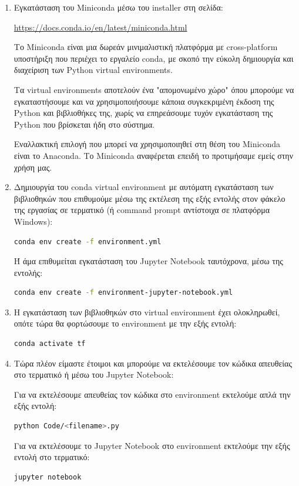 \documentclass[12pt,a4paper]{article}
\begin{document}
\begin{enumerate}
    \item Εγκατάσταση του Miniconda μέσω του installer στη σελίδα:

        \textcolor{blue}{\href{https://docs.conda.io/en/latest/miniconda.html}{https://docs.conda.io/en/latest/miniconda.html}}

         Το Miniconda είναι μια δωρεάν μινιμαλιστική πλατφόρμα με cross-platform υποστήριξη που περιέχει το εργαλείο conda, με σκοπό την εύκολη δημιουργία και διαχείριση των Python virtual environments.

         Τα virtual environments αποτελούν ένα "απομονωμένο χώρο" όπου μπορούμε να εγκαταστήσουμε και να χρησιμοποιήσουμε κάποια συγκεκριμένη έκδοση της Python και βιβλιοθήκες της, χωρίς να επηρεάσουμε τυχόν εγκατάσταση της Python που βρίσκεται ήδη στο σύστημα. 

         Εναλλακτική επιλογή που μπορεί να χρησιμοποιηθεί στη θέση του Miniconda είναι το Anaconda. Το Miniconda αναφέρεται επειδή το προτιμήσαμε εμείς στην χρήση μας.

     \item Δημιουργία του conda virtual environment με αυτόματη εγκατάσταση των βιβλιοθηκών που επιθυμούμε μέσω της εκτέλεση της εξής εντολής στον φάκελο της εργασίας σε τερματικό (ή command prompt αντίστοιχα σε πλατφόρμα Windows):

         \begin{lstlisting}[language=Bash]
conda env create -f environment.yml\end{lstlisting}

         Ή άμα επιθυμείται εγκατάσταση του Jupyter Notebook ταυτόχρονα, μέσω της εντολής:

         \begin{lstlisting}[language=Bash]
conda env create -f environment-jupyter-notebook.yml\end{lstlisting}
     \item Η εγκατάσταση των βιβλιοθηκών στο virtual environment έχει ολοκληρωθεί, οπότε τώρα θα φορτώσουμε το environment με την εξής εντολή:
         \begin{lstlisting}[language=Bash]
conda activate tf\end{lstlisting}
    \item Τώρα πλέον είμαστε έτοιμοι και μπορούμε να εκτελέσουμε τον κώδικα απευθείας στο τερματικό ή μέσω του Jupyter Notebook:

        Για να εκτελέσουμε απευθείας τον κώδικα στο environment εκτελούμε απλά την εξής εντολή:
         \begin{lstlisting}[language=Bash]
python Code/<filename>.py\end{lstlisting}

        Για να εκτελέσουμε το Jupyter Notebook στο environment εκτελούμε την εξής εντολή στο τερματικό:
         \begin{lstlisting}[language=Bash]
jupyter notebook\end{lstlisting}
\end{enumerate}
\end{document}
